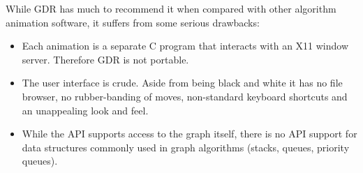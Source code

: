 While GDR has much to recommend it when compared with other algorithm
animation software, it suffers from some serious drawbacks:

\begin{itemize}
\item
  Each animation is a separate C program that interacts with an X11 window
  server.
  Therefore GDR is not portable.
\item
  The user interface is crude. Aside from being black and white it has no
  file browser, no rubber-banding of moves, non-standard keyboard shortcuts
  and an unappealing look and feel.
\item
  While the API supports access to the graph itself, there is no API support for
  data structures commonly used in graph algorithms (stacks, queues, priority
  queues).
\end{itemize}

